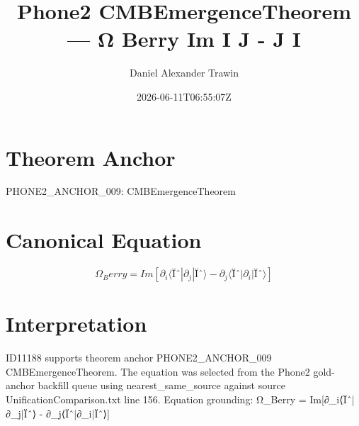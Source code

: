 \documentclass[11pt]{article}
\title{Phone2 CMBEmergenceTheorem — Ω Berry Im I J - J I}
\author{Daniel Alexander Trawin}
\date{2026-06-11T06:55:07Z}
\begin{document}
\maketitle
\section*{Theorem Anchor}
PHONE2_ANCHOR_009: CMBEmergenceTheorem
\section*{Canonical Equation}
\[
Ω_Berry = Im[∂_i⟨Ïˆ|∂_j|Ïˆ⟩ - ∂_j⟨Ïˆ|∂_i|Ïˆ⟩]
\]
\section*{Interpretation}
ID11188 supports theorem anchor PHONE2_ANCHOR_009 CMBEmergenceTheorem. The equation was selected from the Phone2 gold-anchor backfill queue using nearest_same_source against source UnificationComparison.txt line 156. Equation grounding: Ω_Berry = Im[∂_i⟨Ïˆ|∂_j|Ïˆ⟩ - ∂_j⟨Ïˆ|∂_i|Ïˆ⟩]
\end{document}
